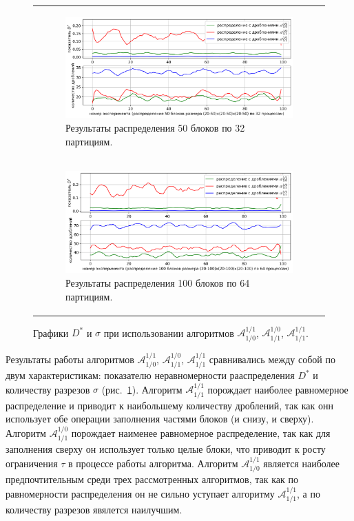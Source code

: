 \documentclass[a4paper,14pt]{extarticle}                     %
\theoremstyle{plain}                                         %
\begin{document}
\begin{figure}[ht]
\centering
\begin{tabular}{l}
\begin{subfigure}{1.0\textwidth}\centering\includegraphics[width=1.0\columnwidth]{fig/par_chart_distr_50_20_50_32.png}\caption{Результаты распределения 50 блоков по 32 партициям.}\end{subfigure} \\
\begin{subfigure}{1.0\textwidth}\centering\includegraphics[width=1.0\columnwidth]{fig/par_chart_distr_100_20_100_64.png}\caption{Результаты распределения 100 блоков по 64 партициям.}\end{subfigure}
\end{tabular}
\singlespacing
\caption{Графики $D^{*}$ и $\sigma$ при использовании алгоритмов $\mathscr{A}_{1/0}^{1/1}$, $\mathscr{A}_{1/1}^{1/0}$, $\mathscr{A}_{1/1}^{1/1}$.}
\label{fig:min_cuts_distr}
\end{figure}

Результаты работы алгоритмов $\mathscr{A}_{1/0}^{1/1}$, $\mathscr{A}_{1/1}^{1/0}$, $\mathscr{A}_{1/1}^{1/1}$ сравнивались между собой по двум характеристикам: показателю неравномерности рааспределения $D^{*}$ и количеству разрезов $\sigma$ (рис.~\ref{fig:min_cuts_distr}).
Алгоритм $\mathscr{A}_{1/1}^{1/1}$ порождает наиболее равномерное распределение и приводит к наибольшему количеству дроблений, так как онн использует обе операции заполнения частями блоков (и снизу, и сверху).
Алгоритм $\mathscr{A}_{1/1}^{1/0}$ порождает наименее равномерное распределение, так как для заполнения сверху он использует только целые блоки, что приводит к росту ограничения $\tau$ в процессе работы алгоритма.
Алгоритм $\mathscr{A}_{1/0}^{1/1}$ является наиболее предпочтительным среди трех рассмотренных алгоритмов, так как по равномерности распределения он не сильно уступает алгоритму $\mathscr{A}_{1/1}^{1/1}$, а по количеству разрезов явялется наилучшим.
\end{document}
